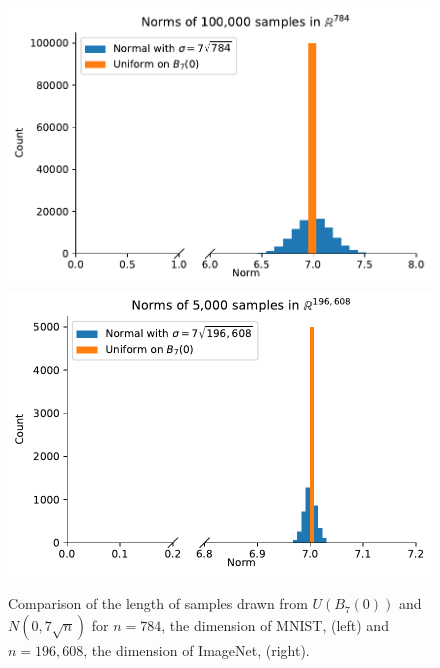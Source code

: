 \begin{figure}[htb]
    \centering
    \includegraphics[width=.5\textwidth]{./c2_figures/mnistsample.pdf}
    \includegraphics[width=.48\textwidth]{./c2_figures/imagenetsample.pdf}
    \caption{Comparison of the length of samples drawn from $U(B_7(0))$ and $N(0,7\sqrt{n})$ for $n=784$, the dimension of MNIST, (left) and $n=196,608$, the dimension of ImageNet, (right).}
    \label{fig:sampling}
\end{figure}




